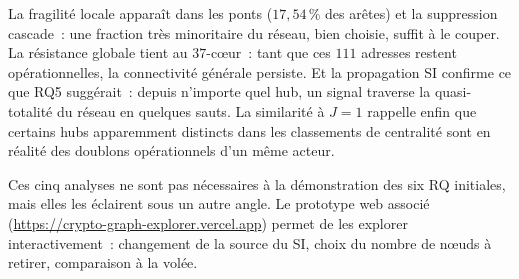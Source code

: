 La fragilit\'e locale appara\^it dans les ponts ($17{,}54\,\%$ des ar\^etes) et la suppression cascade~: une fraction tr\`es minoritaire du r\'eseau, bien choisie, suffit \`a le couper. La r\'esistance globale tient au $37$-c\oe{}ur~: tant que ces $111$ adresses restent op\'erationnelles, la connectivit\'e g\'en\'erale persiste. Et la propagation SI confirme ce que RQ5 sugg\'erait~: depuis n'importe quel hub, un signal traverse la quasi-totalit\'e du r\'eseau en quelques sauts. La similarit\'e \`a $J = 1$ rappelle enfin que certains hubs apparemment distincts dans les classements de centralit\'e sont en r\'ealit\'e des doublons op\'erationnels d'un m\^eme acteur.

Ces cinq analyses ne sont pas n\'ecessaires \`a la d\'emonstration des six RQ initiales, mais elles les \'eclairent sous un autre angle. Le prototype web associ\'e (\url{https://crypto-graph-explorer.vercel.app}) permet de les explorer interactivement~: changement de la source du SI, choix du nombre de n\oe{}uds \`a retirer, comparaison \`a la vol\'ee.
